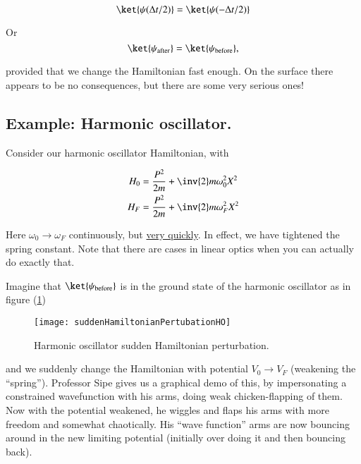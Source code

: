 \begin{equation}\label{eqn:qmTwoL8:180}
\ket{\psi(\Delta t/2)} = \ket{\psi(-\Delta t/2)}
\end{equation}

Or
\begin{equation}\label{eqn:qmTwoL8:200}
\ket{\psi_{\text{after}}} = \ket{\psi_{\text{before}}},
\end{equation}

provided that we change the Hamiltonian fast enough.  On the surface there appears to be no consequences, but there are some very serious ones!

\subsection{Example: Harmonic oscillator.}

Consider our harmonic oscillator Hamiltonian, with

\begin{align}\label{eqn:qmTwoL8:220}
H_0 &= \frac{P^2}{2m} + \inv{2} m \omega_0^2 X^2 \\
H_F &= \frac{P^2}{2m} + \inv{2} m \omega_F^2 X^2
\end{align}

Here $\omega_0 \rightarrow \omega_F$ continuously, but \underline{very quickly}.  In effect, we have tightened the spring constant.  Note that there are cases in linear optics when you can actually do exactly that.

Imagine that $\ket{\psi_{\text{before}}}$ is in the ground state of the harmonic oscillator as in figure (\ref{fig:suddenHamiltonianPertubationHO})

\begin{figure}[htp]
\centering
\texttt{[image: suddenHamiltonianPertubationHO]}
\caption{Harmonic oscillator sudden Hamiltonian perturbation.}\label{fig:suddenHamiltonianPertubationHO}
\end{figure}

and we suddenly change the Hamiltonian with potential $V_0 \rightarrow V_F$ (weakening the ``spring'').  Professor Sipe gives us a graphical demo of this, by impersonating a constrained wavefunction with his arms, doing weak chicken-flapping of them.  Now with the potential weakened, he wiggles and flaps his arms with more freedom and somewhat chaotically.  His ``wave function'' arms are now bouncing around in the new limiting potential (initially over doing it and then bouncing back).

